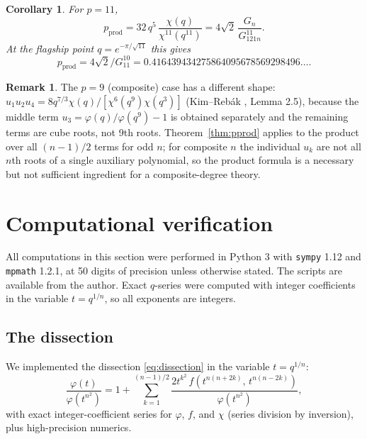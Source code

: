 \documentclass[11pt]{amsart}
\theoremstyle{plain}
\newtheorem{corollary}[theorem]{Corollary}
\theoremstyle{definition}
\newtheorem{remark}[theorem]{Remark}
\theoremstyle{remark}
\newcommand{\pprod}{p_{\mathrm{prod}}}
\begin{document}
\begin{corollary}
For $p=11$,
\begin{equation}
\pprod = 32\,q^5\,\frac{\chi(q)}{\chi^{11}(q^{11})}
= 4\sqrt{2}\,\frac{G_n}{G_{121n}^{11}}.
\end{equation}
At the flagship point $q = e^{-\pi/\sqrt{11}}$ this gives
\begin{equation}
\pprod = 4\sqrt{2}/G_{11}^{10} = 0.416439434275864095678569298496\dots.
\end{equation}
\end{corollary}

\begin{remark}
The $p=9$ (composite) case has a different shape: $u_1u_2u_4 =
8q^{7/3}\chi(q)/[\chi^6(q^9)\chi(q^3)]$ (Kim--Reb\'ak \cite{KR25}, Lemma 2.5),
because the middle term $u_3 = \varphi(q)/\varphi(q^9)-1$ is obtained separately
and the remaining terms are cube roots, not 9th roots. Theorem~\ref{thm:pprod}
applies to the product over all $(n-1)/2$ terms for odd $n$; for composite $n$ the
individual $u_k$ are not all $n$th roots of a single auxiliary polynomial, so the
product formula is a necessary but not sufficient ingredient for a composite-degree
theory.
\end{remark}

\section{Computational verification}
\label{sec:comp}

All computations in this section were performed in Python 3 with \texttt{sympy} 1.12
and \texttt{mpmath} 1.2.1, at 50 digits of precision unless otherwise stated. The
scripts are available from the author. Exact $q$-series were computed with integer
coefficients in the variable $t = q^{1/n}$, so all exponents are integers.

\subsection{The dissection}

We implemented the dissection \eqref{eq:dissection} in the variable $t = q^{1/n}$:
\begin{equation}
\frac{\varphi(t)}{\varphi(t^{n^2})}
= 1 + \sum_{k=1}^{(n-1)/2} \frac{2t^{k^2}\, f(t^{n(n+2k)},\, t^{n(n-2k)})}{\varphi(t^{n^2})},
\end{equation}
with exact integer-coefficient series for $\varphi$, $f$, and $\chi$ (series division
by inversion), plus high-precision numerics.
\end{document}
